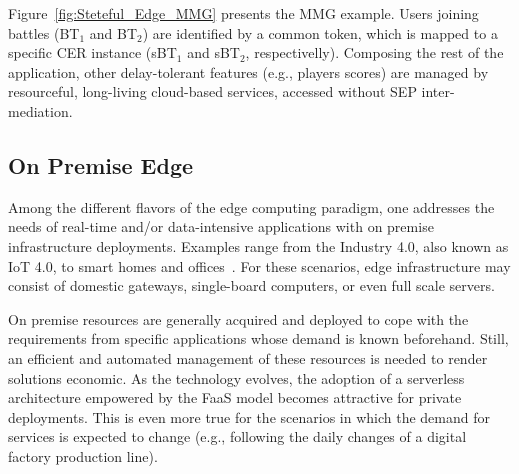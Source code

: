 


Figure~\ref{fig:Steteful_Edge_MMG} presents the MMG example. Users joining battles (BT$_1$ and BT$_2$) are identified by a common token, which is mapped to a specific CER instance (sBT$_1$ and sBT$_2$, respectivelly).
Composing the rest of the application, other delay-tolerant features (e.g., players scores) are managed by resourceful, long-living cloud-based services, accessed without SEP inter-mediation.  %

\subsection{On Premise Edge}

Among the 
different flavors of the edge computing paradigm, one addresses the needs of real-time and/or data-intensive applications with on premise infrastructure deployments. Examples range from the Industry 4.0, also known as IoT 4.0, to
smart homes and offices~\cite{Porambage:2018}. For these scenarios, edge infrastructure may consist of domestic gateways, single-board computers, or even full scale servers.

On premise resources are generally acquired and deployed to cope with the requirements from specific applications whose demand is known beforehand. Still, an efficient and automated management of these resources is needed to render solutions economic. As the technology evolves, the adoption of a serverless architecture empowered by the FaaS model becomes attractive for private deployments. This is even more true for the scenarios in which the demand for services is expected to change (e.g., following the daily changes of a digital factory production line). 

